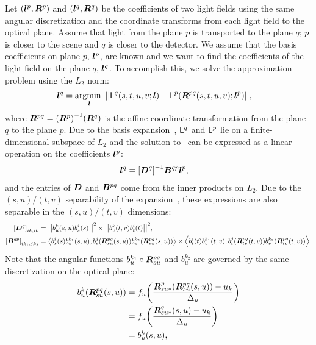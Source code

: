 Let $ {\left( {\bm{l}}^p, {\bm{R}}^p \right)}$ and $ {\left( {\bm{l}}^q, {\bm{R}}^q \right)}$ be the coefficients of two
light fields using the same angular discretization and the coordinate
transforms from each light field to the optical plane.  Assume that light
from the plane $p$ is transported to the plane $q$; \ie{} $p$ is closer to the
scene and $q$ is closer to the detector.  We assume that the basis coefficients
on plane $p$, ${\bm{l}}^p$, are known and we want to find the coefficients of the
light field on the plane $q$, ${\bm{l}}^q$.  To accomplish this, we solve the 
approximation problem using the $L_2$ norm:
\begin{align}
    \bl^q 
    &=
    \argmin_{\bl}
    \GN{%
        \LF^q\GP{s,t,u,v; \bl}
        -
        \LF^p\GP{\bR^{pq}\GP{s,t,u,v}; \bl^p}
    },
    \label{eqn,xport}
\end{align}
where ${\bm{R}}^{pq} =  {\left( {\bm{R}}^p \right)}^{-1} {\left( {\bm{R}}^q \right)}$ is the affine coordinate
transformation from the plane $q$ to the plane $p$.  Due to the basis 
expansion~, $\mathsf{L}^q$ and $\mathsf{L}^p$ lie on a finite-dimensional
subspace of $L_2$ and the solution to~ can be expressed as a 
linear operation on the coefficients ${\bm{l}}^p$:
\begin{align}
    {\ensuremath{\bm{l}}}^q
    &=
     {\left[ {\bm{D}}^q \right] }^{-1} {\bm{B}}^{qp} {\bm{l}}^p,
\end{align}
and the entries of ${\bm{D}}$ and ${\bm{B}}^{pq}$ come from the inner products on
$L_2$.  Due to the $(s,u)/(t,v)$ separability of the 
expansion~, these expressions are also separable in the
$(s,u)/(t,v)$ dimensions:
\begin{align}
    \GB{\bD^q}_{ik, ik}
    &=
    \GN{%
        b^k_u\GP{s,u} b^i_s\GP{s}
    }^2
    \times
    \GN{%
        b^k_v\GP{t,v} b^i_t\GP{t}
    }^2,
    \nonumber \\
    \GB{\bB^{qp}}_{ik_1, jk_2}
    &=
    \GA{%
        b^i_s\GP{s} b^{k_1}_u\GP{s,u}, 
        b^j_s\GP{\bR^{pq}_{su}\GP{s,u}} b^{k_2}_u\GP{\bR^{pq}_{su}\GP{s,u}}
    }
    \times
    \GA{%
        b^i_t\GP{t} b^{k_1}_v\GP{t,v},
        b^j_t\GP{\bR^{pq}_{tv}\GP{t,v}} b^{k_2}_v\GP{\bR^{pq}_{tv}\GP{t,v}} 
    }.
    \label{eqn,iprod}
\end{align}
Note that the angular functions $b^{k_1}_u \circ {\ensuremath{\bm{R}}}^{pq}_{su}$ and $b^{k_2}_u$
are governed by the same discretization on the optical plane:
\begin{align}
    b^{k}_u {\left( {\bm{R}}^{pq}_{su} {\left( s,u \right)} \right)}
    &=
    f_u {\left( \frac{{\bm{R}}^p_{su*} {\left( {\bm{R}}^{pq}_{su} {\left( s,u \right)} \right)} - u_{k}}{\Delta_u} \right)} 
    \nonumber \\
    &=
    f_u {\left( \frac{{\bm{R}}^{q}_{su*} {\left( s,u \right)} - u_{k}}{\Delta_u} \right)} 
    \nonumber \\
    &=
    b^{k}_u {\left( s,u \right)},
    \label{eqn,same,angle}
\end{align}
